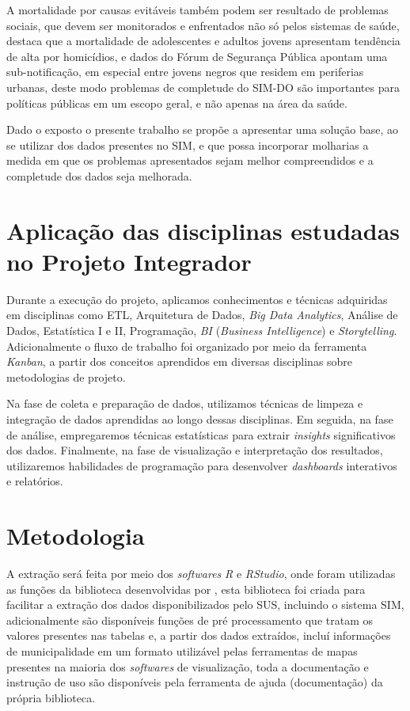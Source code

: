 A mortalidade por causas evitáveis também podem ser resultado de problemas sociais, que devem ser monitorados e enfrentados não só pelos sistemas de saúde,  destaca que a mortalidade de adolescentes e adultos jovens apresentam tendência de alta por homicídios, e dados do  Fórum de Segurança Pública apontam uma sub-notificação, em especial entre jovens negros que residem em periferias urbanas, deste modo problemas de completude do SIM-DO são importantes para políticas públicas em um escopo geral, e não apenas na área da saúde.

Dado o exposto o presente trabalho se propõe a apresentar uma solução base, ao se utilizar dos dados presentes no SIM, e que possa incorporar molharias a medida em que os problemas apresentados sejam melhor compreendidos e a completude dos dados seja melhorada.



 

\section{Aplicação das disciplinas estudadas no Projeto Integrador}

Durante a execução do projeto, aplicamos conhecimentos e técnicas adquiridas em disciplinas como ETL, Arquitetura de Dados, \textit{Big Data Analytics}, Análise de Dados, Estatística I e II, Programação, \textit{BI} (\textit{Business Intelligence}) e \textit{Storytelling}. Adicionalmente o fluxo de trabalho foi organizado por meio da ferramenta \textit{Kanban}, a partir dos conceitos aprendidos em diversas disciplinas sobre metodologias de projeto.

Na fase de coleta e preparação de dados, utilizamos técnicas de limpeza e integração de dados aprendidas ao longo dessas disciplinas. Em seguida, na fase de análise, empregaremos técnicas estatísticas para extrair \textit{insights} significativos dos dados. Finalmente, na fase de visualização e interpretação dos resultados, utilizaremos habilidades de programação para desenvolver \textit{dashboards} interativos e relatórios.


\section{Metodologia}

A extração será feita por meio dos \textit{softwares} \textit{R} e \textit{RStudio}, onde foram utilizadas as funções da biblioteca desenvolvidas por , esta biblioteca foi criada para facilitar a extração dos dados disponibilizados pelo SUS, incluindo o sistema SIM, adicionalmente são disponíveis funções de pré processamento que tratam os valores presentes nas tabelas e, a partir dos dados extraídos, incluí informações de municipalidade em um formato utilizável pelas ferramentas de mapas presentes na maioria dos \textit{softwares} de visualização, toda a documentação e instrução de uso são disponíveis pela ferramenta de ajuda (documentação) da própria biblioteca.

